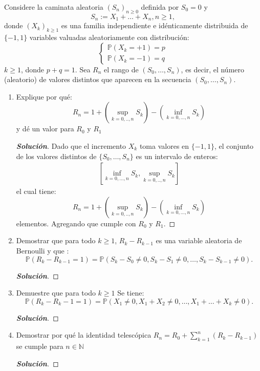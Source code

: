 \documentclass[12pt, letterpaper]{article}
\newcommand{\p}{\mathbb{P}}
\newenvironment{manualtheorem}[1]{%
  \renewcommand\themanualtheoreminner{#1}%
  \manualtheoreminner
}{\endmanualtheoreminner}
\newenvironment{solucion}
  {\renewcommand\qedsymbol{$\square$}\begin{proof}[\textbf{Solución}]}
  {\end{proof}}
\begin{document}
    
    \begin{manualtheorem}{4.2}
    Considere la caminata aleatoria $(S_n)_{n \geq 0}$ definida por $S_0 = 0$ y $$S_n:=X_1+\dots+X_n, n\geq 1,$$
    donde $(X_k)_{k \geq 1}$ es una familia independiente e idénticamente distribuida de $\{-1,1\}$ variables valuadas aleatoriamente con distribución:
    $$\left\{\begin{matrix}
    \p(X_k=+1)=p\\ 
    \p(X_k=-1)=q
    \end{matrix}\right.$$
    $k \geq 1$, donde $p + q = 1$. Sea $R_n$ el rango de $(S_0, \dots, S_n)$,
    es decir, el número (aleatorio) de valores distintos que aparecen en la secuencia
    $(S_0, \dots, S_n)$.
    \renewcommand{\labelenumi}{(\alph{enumi})}
    \begin{enumerate}
        \item Explique por qué:
        $$R_n=1+\left( \sup_{k=0,..,n}S_k \right) -\left( \inf_{k=0,\dots,n}S_k \right)$$
        y dé un valor para $R_0$ y $R_1$
        \begin{solucion}
            Dado que el incremento $X_k$ toma valores en $\{-1,1\}$, el conjunto de los valores distintos de $\{S_0,\dots,S_n\}$ es un intervalo de enteros:
            \begin{align*}
                \left[\inf_{k=0,\dots,n}S_k ,\sup_{k=0,..,n}S_k\right]
            \end{align*}
            el cual tiene:
            $$R_n=1+\left( \sup_{k=0,..,n}S_k \right) -\left( \inf_{k=0,\dots,n}S_k \right)$$
            elementos. Agregando que cumple con $R_0$ y $R_1$.
        \end{solucion}
        
        \item Demostrar que para todo  $k \geq 1$, $R_k - R_{k-1}$ es una variable aleatoria de Bernoulli y que :
        $$\p(R_k-R_{k-1}=1)=\p(S_k-S_0 \neq 0 , S_k-S_1\neq 0, \dots, S_k-S_{k-1}\neq 0).$$
        \begin{solucion}
        \end{solucion}
        
        \item Demuestre que para todo $k \geq 1 $ Se tiene:
        $$\p(R_k-R_k-1=1)=\p(X_1\neq0,X_1+X_2\neq0,\dots,X_1+\dots+X_k\neq 0).$$
        \begin{solucion}
        \end{solucion}
        
        \item Demostrar por qué la identidad telescópica $R_n=R_0+\sum^{n}_{k=1}(R_k-R_{k-1})$ se cumple para $n \in \mathbb{N}$
        \begin{solucion}
        \end{solucion}
        

\end{enumerate}
\end{manualtheorem}
\end{document}
